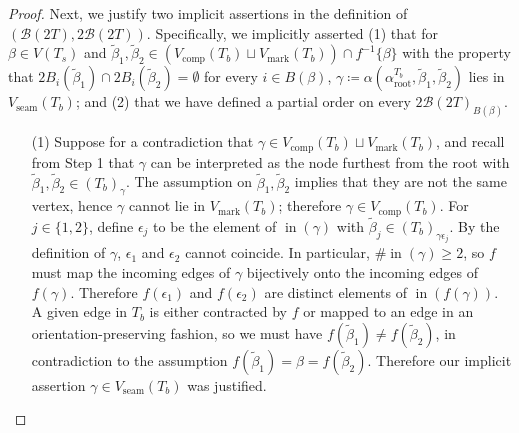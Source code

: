 \documentclass[11pt]{amsart}
\theoremstyle{definition}
\theoremstyle{remark}
\theoremstyle{plain}
\newcommand{\sB}{\mathscr{B}}
\newcommand{\stB}{2\mathscr{B}}
\newcommand{\on}{\operatorname}
\newcommand{\comp}{C^2}
\renewcommand{\comp}{{\on{comp}}}
\newcommand{\seam}{{\on{seam}}}
\newcommand{\mk}{{\on{mark}}}
\newcommand{\incom}{\on{in}}
\renewcommand{\root}{{\on{root}}}
\newcommand{\wt}{\widetilde}
\newcommand{\eps}{\epsilon}
\begin{document}
\begin{proof}
Next, we justify two implicit assertions in the definition of $(\sB(2T), \stB(2T))$.
Specifically, we implicitly asserted (1) that for $\beta \in V(T_s)$ and $\wt\beta_1,\wt\beta_2 \in (V_\comp(T_b) \sqcup V_\mk(T_b)) \cap f^{-1}\{\beta\}$ with the property that $2B_i(\wt\beta_1) \cap 2B_i(\wt\beta_2) = \emptyset$ for every $i \in B(\beta)$, $\gamma \coloneqq \alpha(\alpha_\root^{T_b},\wt\beta_1,\wt\beta_2)$ lies in $V_\seam(T_b)$; and (2) that we have defined a partial order on every $\stB(2T)_{B(\beta)}$.
\begin{itemize}
\item[(1)] Suppose for a contradiction that $\gamma \in V_\comp(T_b) \sqcup V_\mk(T_b)$, and recall from Step 1 that $\gamma$ can be interpreted as the node furthest from the root with $\wt\beta_1,\wt\beta_2 \in (T_b)_\gamma$.
The assumption on $\wt\beta_1,\wt\beta_2$ implies that they are not the same vertex, hence $\gamma$ cannot lie in $V_\mk(T_b)$; therefore $\gamma \in V_\comp(T_b)$.
For $j \in \{1,2\}$, define $\eps_j$ to be the element of $\incom(\gamma)$ with $\wt\beta_j \in (T_b)_{\gamma\eps_j}$.
By the definition of $\gamma$, $\eps_1$ and $\eps_2$ cannot coincide.
In particular, $\#\!\incom(\gamma) \geq 2$, so $f$ must map the incoming edges of $\gamma$ bijectively onto the incoming edges of $f(\gamma)$.
Therefore $f(\eps_1)$ and $f(\eps_2)$ are distinct elements of $\incom(f(\gamma))$.
A given edge in $T_b$ is either contracted by $f$ or mapped to an edge in an orientation-preserving fashion, so we must have $f(\wt\beta_1) \neq f(\wt\beta_2)$, in contradiction to the assumption $f(\wt\beta_1) = \beta = f(\wt\beta_2)$.
Therefore our implicit assertion $\gamma \in V_\seam(T_b)$ was justified.


\end{itemize}
\end{proof}
\end{document}

